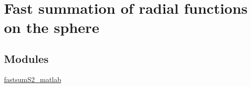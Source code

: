 \hypertarget{group__applications__fastsumS2}{
\section{Fast summation of radial functions on the sphere}
\label{group__applications__fastsumS2}
}
\subsection*{Modules}
\begin{CompactItemize}
\item 
\hyperlink{group__applications__fastsumS2__test}{fastsum\-S2\_\-matlab}
\end{CompactItemize}
